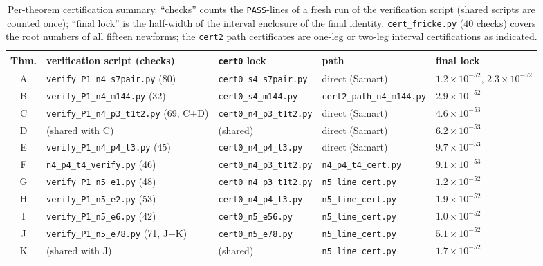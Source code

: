 \documentclass[11pt]{article}
\theoremstyle{definition}
\theoremstyle{remark}
\begin{document}
\begin{table}[htb]
\centering\scriptsize
\caption{Per-theorem certification summary. ``checks'' counts the
\texttt{PASS}-lines of a fresh run of the verification script (shared
scripts are counted once); ``final lock'' is the half-width of the
interval enclosure of the final identity. \texttt{cert\_fricke.py}
($40$ checks) covers the root numbers of all fifteen newforms; the
\texttt{cert2} path certificates are one-leg or two-leg interval
certifications as indicated.}
\label{tab:certdata}
\setlength{\tabcolsep}{3.5pt}
\begin{tabular}{cllll}
\toprule
Thm. & verification script (checks) & \texttt{cert0} lock & path &
final lock\\
\midrule
A & \texttt{verify\_P1\_n4\_s7pair.py} (80) &
  \texttt{cert0\_s4\_s7pair.py} & direct (Samart) &
  $1.2\!\times\!10^{-52}$, $2.3\!\times\!10^{-52}$\\
B & \texttt{verify\_P1\_n4\_m144.py} (32) & \texttt{cert0\_s4\_m144.py}
  & \texttt{cert2\_path\_n4\_m144.py} & $2.9\!\times\!10^{-52}$\\
C & \texttt{verify\_P1\_n4\_p3\_t1t2.py} (69, C+D) &
  \texttt{cert0\_n4\_p3\_t1t2.py} & direct (Samart) &
  $4.6\!\times\!10^{-53}$\\
D & (shared with C) & (shared) & direct (Samart) &
  $6.2\!\times\!10^{-53}$\\
E & \texttt{verify\_P1\_n4\_p4\_t3.py} (45) &
  \texttt{cert0\_n4\_p4\_t3.py} & direct (Samart) &
  $9.7\!\times\!10^{-53}$\\
F & \texttt{n4\_p4\_t4\_verify.py} (46) & \texttt{cert0\_n4\_p3\_t1t2.py}
  & \texttt{n4\_p4\_t4\_cert.py} & $9.1\!\times\!10^{-53}$\\
G & \texttt{verify\_P1\_n5\_e1.py} (48) & \texttt{cert0\_n4\_p3\_t1t2.py}
  & \texttt{n5\_line\_cert.py} & $1.2\!\times\!10^{-52}$\\
H & \texttt{verify\_P1\_n5\_e2.py} (53) & \texttt{cert0\_n4\_p4\_t3.py}
  & \texttt{n5\_line\_cert.py} & $1.9\!\times\!10^{-52}$\\
I & \texttt{verify\_P1\_n5\_e6.py} (42) & \texttt{cert0\_n5\_e56.py}
  & \texttt{n5\_line\_cert.py} & $1.0\!\times\!10^{-52}$\\
J & \texttt{verify\_P1\_n5\_e78.py} (71, J+K) &
  \texttt{cert0\_n5\_e78.py} & \texttt{n5\_line\_cert.py} &
  $5.1\!\times\!10^{-52}$\\
K & (shared with J) & (shared) & \texttt{n5\_line\_cert.py} &
  $1.7\!\times\!10^{-52}$\\
\bottomrule
\end{tabular}
\end{table}
\end{document}
